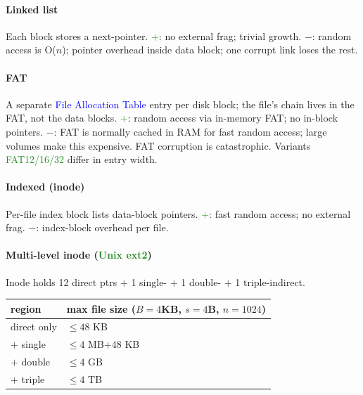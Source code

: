 \paragraph{Linked list} Each block stores a next-pointer.
\textcolor{ForestGreen}{+}: no external frag; trivial growth.
\textcolor{Bittersweet}{$-$}: random access is O($n$); pointer overhead inside data block; one corrupt link loses the rest.

\paragraph{FAT} A separate \textcolor{Blue}{File Allocation Table} entry per disk block; the file's chain lives in the FAT, not the data blocks.
\textcolor{ForestGreen}{+}: random access via in-memory FAT; no in-block pointers.
\textcolor{Bittersweet}{$-$}: FAT is normally cached in RAM for fast random access; large volumes make this expensive. FAT corruption is catastrophic. Variants \textcolor{ForestGreen}{FAT12/16/32} differ in entry width.

\paragraph{Indexed (inode)} Per-file index block lists data-block pointers.
\textcolor{ForestGreen}{+}: fast random access; no external frag.
\textcolor{Bittersweet}{$-$}: index-block overhead per file.

\paragraph{Multi-level inode (\textcolor{ForestGreen}{Unix ext2})}
Inode holds 12 \textcolor{Bittersweet}{direct} ptrs $+$ 1 \textcolor{Bittersweet}{single-} $+$ 1 \textcolor{Bittersweet}{double-} $+$ 1 \textcolor{Bittersweet}{triple-indirect}.

\begin{center}
\end{center}

\noindent\begin{tabular}{@{}ll@{}}
\toprule
region & max file size ($B{=}4$KB, $s{=}4$B, $n{=}1024$) \\
\midrule
direct only & $\le 48$ KB \\
$+$ single & $\le 4$ MB$+48$ KB \\
$+$ double & $\le 4$ GB \\
$+$ triple & $\le 4$ TB \\
\bottomrule
\end{tabular}

